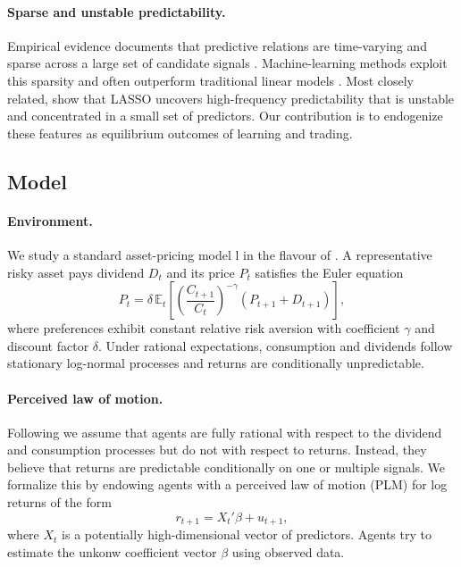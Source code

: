 \documentclass[11pt]{article}
\begin{document}
\paragraph{Sparse and unstable predictability.}
Empirical evidence documents that predictive relations are time-varying \citep{AngBekaert2007_RFS,GoyalWelch2003_MS,LettauLudvigson2001_JF} and sparse across a large set of candidate signals \citep{kozak2020shrinking,freyberger2020dissecting,Feng2020}.
Machine-learning methods exploit this sparsity and often outperform traditional linear models \citep{gu2020empirical}.
Most closely related, \cite{Chinco2019} show that LASSO uncovers high-frequency predictability that is unstable and concentrated in a small set of predictors.
Our contribution is to endogenize these features as equilibrium outcomes of learning and trading.













\subsection*{Model}

\paragraph{Environment.}
We study a standard \cite{Lucas1978} asset-pricing model l in the flavour of \cite{Adam2016}.
A representative risky asset pays dividend $D_t$ and its price $P_t$ satisfies the Euler equation
\begin{equation}\label{eq:euler}
P_t = \delta\,\mathbb{E}_t\!\left[\left(\frac{C_{t+1}}{C_t}\right)^{-\gamma}(P_{t+1}+D_{t+1})\right],
\end{equation}
where preferences exhibit constant relative risk aversion with coefficient $\gamma$ and discount factor $\delta$.
Under rational expectations, consumption and dividends follow stationary log-normal processes and returns are conditionally unpredictable.

\paragraph{Perceived law of motion.}
Following \cite{Adam2016} we assume that agents are fully rational with respect to the dividend and consumption processes but do not with respect to returns.
Instead, they believe that returns are predictable conditionally on one or multiple signals.
We formalize this by endowing agents with a perceived law of motion (PLM) for log returns of the form
\begin{equation}
r_{t+1} = X_t'\beta + u_{t+1},
\end{equation}
where $X_t$ is a potentially high-dimensional vector of predictors.
Agents try to estimate the unkonw coefficient vector $\beta$ using observed data.
\end{document}

